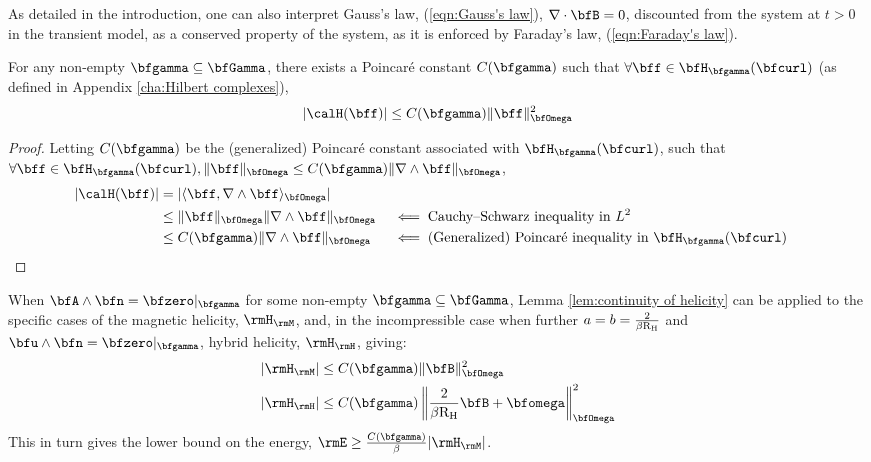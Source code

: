     As detailed in the introduction, one can also interpret Gauss's law, (\ref{eqn:Gauss's law}), $\nabla\cdot\bfB  =  0$, discounted from the system at $t  >  0$ in the transient model, as a conserved property of the system, as it is enforced by Faraday's law, (\ref{eqn:Faraday's law}).
    
    \line
    
    \begin{lemma}\label{lem:continuity of helicity}
        For any non-empty $\bfgamma  \subseteq  \bfGamma$, there exists a Poincaré constant $C(\bfgamma)$ such that $\forall  \bff  \in  \bfH_{\bfgamma}(\bfcurl)$ (as defined in Appendix \ref{cha:Hilbert complexes}),
        \begin{equation}
            |\calH(\bff)|  \leq  C(\bfgamma)\|\bff\|_{\bfOmega}^{2}
        \end{equation}
    \end{lemma}
    \begin{proof}
        Letting $C(\bfgamma)$ be the (generalized) Poincaré constant associated with $\bfH_{\bfgamma}(\bfcurl)$, such that $\forall \bff \in \bfH_{\bfgamma}(\bfcurl), \|\bff\|_{\bfOmega}  \leq  C(\bfgamma)\|\nabla\wedge\bff\|_{\bfOmega}$,
        \begin{align}
            |\calH(\bff)|  &=  |\langle\bff, \nabla\wedge\bff\rangle_{\bfOmega}|  \\
            &\leq  \|\bff\|_{\bfOmega}\|\nabla\wedge\bff\|_{\bfOmega}  &&\impliedby  \text{Cauchy--Schwarz inequality in } L^{2}  \\
            &\leq  C(\bfgamma)\|\nabla\wedge\bff\|_{\bfOmega}  &&\impliedby  \text{(Generalized) Poincaré inequality in } \bfH_{\bfgamma}(\bfcurl)
        \end{align}
    \end{proof}
    
    \begin{corollary}
        When $\bfA\wedge\bfn  =  \bfzero|_{\bfgamma}$ for some non-empty $\bfgamma  \subseteq  \bfGamma$, Lemma \ref{lem:continuity of helicity} can be applied to the specific cases of the magnetic helicity, $\rmH_{\rmM}$, \BA{[Ref]} and, in the incompressible case when further $a  =  b  =  \frac{2}{\beta\mathrm{R}_{\mathrm{H}}}$ and $\bfu\wedge\bfn  =  \bfzero|_{\bfgamma}$, hybrid helicity, $\rmH_{\rmH}$, \cite{LHF22} giving:
        \begin{align}
            |\rmH_{\rmM}|  &\leq  C(\bfgamma)\|\bfB\|_{\bfOmega}^{2}  \\
            |\rmH_{\rmH}|  &\leq  C(\bfgamma)\left\|\frac{2}{\beta\rmRH}\bfB + \bfomega\right\|_{\bfOmega}^{2}
        \end{align}
        This in turn gives the lower bound on the energy, $\rmE  \geq  \frac{C(\bfgamma)}{\beta}|\rmH_{\rmM}|$.
    \end{corollary}

